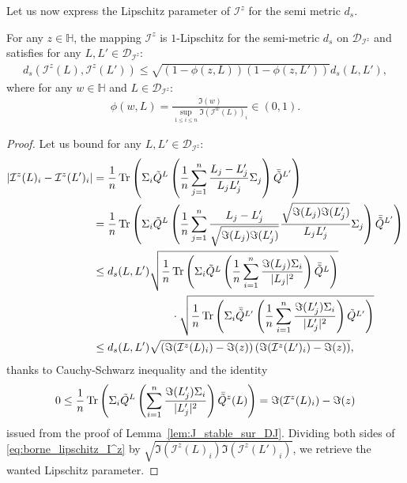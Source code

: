 \documentclass[a4papaer, titlepage]{book}
\begin{document}
Let us now express the Lipschitz parameter of $\mathcal I^z$ for the semi metric $d_s$.
\begin{proposition}\label{pro:I_z_contractante}
  For any $z \in \mathbb H$, the mapping $\mathcal I^z$ is $1$-Lipschitz for the semi-metric $d_s$ on $\mathcal D_{\mathcal I^z}$ and satisfies for any $L,L' \in \mathcal D_{\mathcal I^z}$:
  \begin{align*}
    d_s(\mathcal I^z(L), \mathcal I^z(L') )
    \leq \sqrt{(1-\phi(z,L))(1-\phi(z,L'))} d_s(L, L' ),
  \end{align*}
  where for any $w \in \mathbb H $ and $L \in\mathcal D_{\mathcal I^z}$:
  \begin{align*}
    \phi(w,L) =     \frac{\Im(w)}{\sup_{1\leq i \leq n}\Im(\mathcal I^w(L))_i} \in (0,1).
  \end{align*}
\end{proposition}
\begin{proof}
  Let us bound for any $L,L' \in \mathcal D_{\mathcal I^z}$:
  \begin{align}\label{eq:borne_lipschitz_I^z}
    \left\vert \mathcal I^z(L)_i - \mathcal I^z(L')_i \right\vert
    &= \frac{1}{n}\operatorname{Tr}\left(\Sigma_i \tilde Q^L \left(\frac{1}{n}\sum_{j=1}^n \frac{ L_j - L'_j}{L_j L'_j}\Sigma_j  \right)\bar{\tilde Q}^{L'}\right) \nonumber \\
    &= \frac{1}{n}\operatorname{Tr}\left(\Sigma_i \tilde Q^L \left(\frac{1}{n}\sum_{j=1}^n \frac{ L_j - L'_j}{\sqrt{\Im(L_j)\Im(L'_j)}}\frac{\sqrt{\Im(L_j)\Im(L'_j)}}{L_j L'_j}\Sigma_j  \right)\bar{\tilde Q}^{L'}\right) \nonumber \\
    &\leq d_s(L,L') \sqrt{\frac{1}{n}\operatorname{Tr}\left(\Sigma_i \tilde Q^L \left(\frac{1}{n}\sum_{i=1}^n \frac{\Im(L_j)\Sigma_i}{|L_j|^2}\right)\bar {\tilde Q}^L\right)}\nonumber\\
    &\hspace{2.5cm}\cdot \sqrt{\frac{1}{n}\operatorname{Tr}\left(\Sigma_i \bar {\tilde Q}^{L'} \left(\frac{1}{n}\sum_{i=1}^n \frac{\Im(L_j')\Sigma_i}{|L_j'|^2}\right)\tilde Q^{L'}\right) } \nonumber\\
    & \leq d_s(L,L') \sqrt{\left(\Im(\mathcal I^z(L)_i) - \Im(z)\right)(\Im(\mathcal I^z(L')_i) - \Im(z))},
  \end{align}
  thanks to Cauchy-Schwarz inequality and the identity
  \begin{align*}%
    0 \leq \frac{1}{n}\tr\left(\Sigma_i \tilde Q^L\left(\sum_{i=1}^n \frac{\Im(L_j')\Sigma_i}{|L_j'|^2}\right)\bar{\tilde Q}^z(L) \right) = \Im(\mathcal I^z(L)_i) - \Im(z)
  \end{align*}
  issued from the proof of Lemma~\ref{lem:J_stable_sur_DJ}.
  Dividing both sides of \eqref{eq:borne_lipschitz_I^z} by $\sqrt{\Im(\mathcal I^z(L)_i)\Im(\mathcal I^z(L')_i)}$, we retrieve the wanted Lipschitz parameter.

\end{proof}
\end{document}
